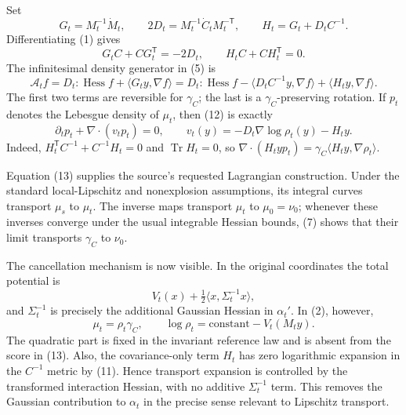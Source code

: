 \documentclass[11pt]{article}
\newcommand{\Tr}{\operatorname{Tr}}
\newcommand{\Hess}{\operatorname{Hess}}
\begin{document}
Set
\begin{equation*}
 G_t=M_t^{-1}\dot M_t,\qquad
 2D_t=M_t^{-1}\dot C_tM_t^{-\mathsf T},\qquad
 H_t=G_t+D_tC^{-1}.                                                 \tag{10}
\end{equation*}
Differentiating (1) gives
\begin{equation*}
 G_tC+CG_t^{\mathsf T}=-2D_t,\qquad
 H_tC+CH_t^{\mathsf T}=0.                                         \tag{11}
\end{equation*}
The infinitesimal density generator in (5) is
\begin{equation*}
 \mathcal A_tf=D_t:\Hess f+\langle G_ty,\nabla f\rangle
 =D_t:\Hess f-\langle D_tC^{-1}y,\nabla f\rangle
   +\langle H_ty,\nabla f\rangle.                                 \tag{12}
\end{equation*}
The first two terms are reversible for $\gamma_C$; the last is a
$\gamma_C$-preserving rotation.  If $p_t$ denotes the Lebesgue density of
$\mu_t$, then (12) is exactly
\begin{equation*}
 \partial_tp_t+\nabla\!\cdot(v_tp_t)=0,
 \qquad
 v_t(y)=-D_t\nabla\log\rho_t(y)-H_ty.                              \tag{13}
\end{equation*}
Indeed, $H_t^{\mathsf T}C^{-1}+C^{-1}H_t=0$ and $\Tr H_t=0$, so
$\nabla\cdot(H_typ_t)=\gamma_C\langle H_ty,\nabla\rho_t\rangle$.

Equation (13) supplies the source's requested Lagrangian construction.
Under the standard local-Lipschitz and nonexplosion assumptions, its integral
curves transport $\mu_s$ to $\mu_t$.  The inverse maps transport $\mu_t$ to
$\mu_0=\nu_0$; whenever these inverses converge under the usual integrable
Hessian bounds, (7) shows that their limit transports $\gamma_C$ to $\nu_0$.

The cancellation mechanism is now visible.  In the original coordinates the
total potential is
\[
 V_t(x)+\tfrac12\langle x,\Sigma_t^{-1}x\rangle,
\]
and $\Sigma_t^{-1}$ is precisely the additional Gaussian Hessian in
$\alpha_t'$.  In (2), however,
\[
 \mu_t=\rho_t\gamma_C,\qquad
 \log\rho_t=\text{constant}-V_t(M_ty).
\]
The quadratic part is fixed in the invariant reference law and is absent
from the score in (13).  Also, the covariance-only term $H_t$ has zero
logarithmic expansion in the $C^{-1}$ metric by (11).  Hence transport
expansion is controlled by the transformed interaction Hessian, with no
additive $\Sigma_t^{-1}$ term.  This removes the Gaussian contribution to
$\alpha_t$ in the precise sense relevant to Lipschitz transport.
\end{document}
